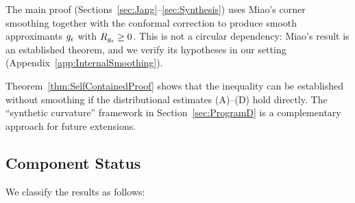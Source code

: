 \begin{remark}\label{rem:SelfContainedClarification}
The main proof (Sections~\ref{sec:Jang}--\ref{sec:Synthesis}) uses Miao's corner smoothing \cite{miao2002} together with the conformal correction to produce smooth approximants $g_{\epsilon}$ with $R_{g_{\epsilon}} \ge 0$. This is not a circular dependency: Miao's result is an established theorem, and we verify its hypotheses in our setting (Appendix~\ref{app:InternalSmoothing}).

Theorem~\ref{thm:SelfContainedProof} shows that the inequality can be established without smoothing if the distributional estimates (A)--(D) hold directly. The ``synthetic curvature'' framework in Section~\ref{sec:ProgramD} is a complementary approach for future extensions.
\end{remark}

\subsection{Component Status}

We classify the results as follows:

